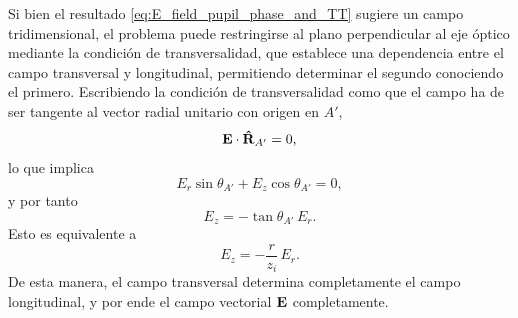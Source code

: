 Si bien el resultado \eqref{eq:E_field_pupil_phase_and_TT} sugiere un campo tridimensional, el problema puede restringirse al plano perpendicular al eje óptico mediante la condición de transversalidad, que establece una dependencia entre el campo transversal y longitudinal, permitiendo determinar el segundo conociendo el primero. Escribiendo la condición de transversalidad como que el campo ha de ser tangente al vector radial unitario con origen en $A'$,
\begin{equation}
\vb{E}\cdot\bm{\hat{\mathbf{R}}}_{A'}=0,
\label{eq:transversality_condition}
\end{equation}
lo que implica
\begin{equation}
E_r\sin\theta_{A'} + E_z\cos\theta_{A'} = 0,
\end{equation}
y por tanto
\begin{equation}
E_z
=
-\tan\theta_{A'}\,E_r.
\label{eq:Ez_from_Er}
\end{equation}
Esto es equivalente a
\begin{equation}
  E_z
  =
  -\frac{r}{z_i} \,E_r.
\label{eq:Ez_from_Er_rz}
\end{equation}
De esta manera, el campo transversal determina completamente el campo longitudinal, y por ende el campo vectorial $\vb E$ completamente.

